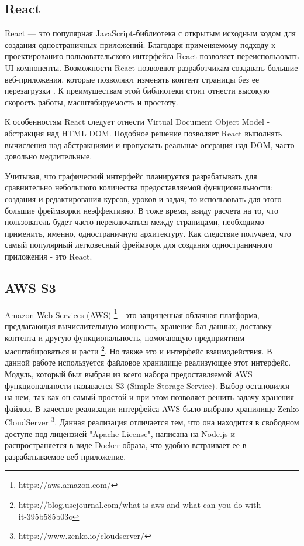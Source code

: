 \documentclass[%
  a5paper,
  subf,
  href,
  master,
  dotsinheaders 
]{csse-fcs}
\begin{document}
\subsection{React}

React — это популярная JavaScript-библиотека с открытым исходным кодом для создания одностраничных приложений. Благодаря применяемому подходу к проектированию пользовательского интерфейса React позволяет переиспользовать UI-компоненты. Возможности React позволяют разработчикам создавать большие веб-приложения, которые позволяют изменять контент страницы без ее перезагрузки \cite{react}. К преимуществам этой библиотеки стоит отнести высокую скорость работы, масштабируемость и простоту.

К особенностям React следует отнести Virtual Document Object Model - абстракция над HTML DOM. Подобное решение позволяет React выполнять вычисления над абстракциями и пропускать реальные операция над DOM, часто довольно медлительные.


Учитывая, что графический интерфейс планируется разрабатывать для сравнительно небольшого количества предоставляемой функциональности: создания и редактирования курсов, уроков и задач, то использовать для этого большие фреймворки неэффективно. В тоже время, ввиду расчета на то, что пользователь будет часто переключаться между страницами, необходимо применить, именно, одностраничную архитектуру. Как следствие получаем, что самый популярный легковесный фреймворк для создания одностраничного приложения - это React.

\subsection{AWS S3}

Amazon Web Services (AWS) \footnote{https://aws.amazon.com/} - это защищенная облачная платформа, предлагающая вычислительную мощность, хранение баз данных, доставку контента и другую функциональность, помогающую предприятиям масштабироваться и расти \footnote{https://blog.usejournal.com/what-is-aws-and-what-can-you-do-with- \\ it-395b585b03c}.
Но также это и интерфейс взаимодействия.
В данной работе используется файловое хранилище реализующее этот интерфейс. Модуль, который был выбран из всего набора предоставляемой AWS функциональности называется S3 (Simple Storage Service). 
Выбор остановился на нем, так как он самый простой и при этом позволяет решить задачу хранения файлов. В качестве реализации интерфейса AWS  было выбрано хранилище Zenko CloudServer \footnote{https://www.zenko.io/cloudserver/}.
Данная реализация отличается тем, что она находится в свободном доступе под лицензией "Apache License"{}, написана на Node.js и распространяется в виде Docker-образа, что удобно встраивает ее в разрабатываемое веб-приложение.
\end{document}

